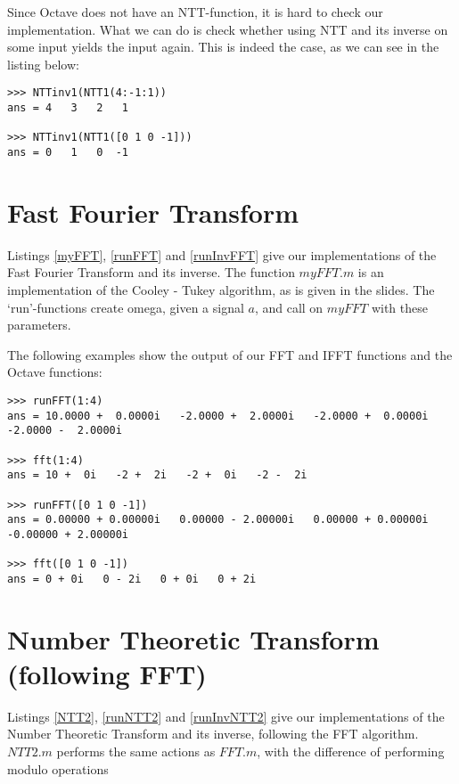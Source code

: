 \documentclass{article}
\begin{document}
Since Octave does not have an NTT-function, it is hard to check our implementation.
What we can do is check whether using NTT and its inverse on some input yields
the input again. This is indeed the case, as we can see in the listing below:

\begin{lstlisting}
>>> NTTinv1(NTT1(4:-1:1))
ans = 4   3   2   1

>>> NTTinv1(NTT1([0 1 0 -1]))
ans = 0   1   0  -1
\end{lstlisting}

 
 
 

\section{Fast Fourier Transform}
Listings \ref{myFFT}, \ref{runFFT} and \ref{runInvFFT} give our implementations of the Fast Fourier Transform and its inverse. The function $myFFT.m$ is an implementation of the Cooley - Tukey algorithm, as is given in the slides. The `run'-functions create omega, given a signal $a$, and call on $myFFT$ with these parameters.

The following examples show the output of our FFT and IFFT functions and the Octave functions:

\begin{lstlisting}
>>> runFFT(1:4)
ans = 10.0000 +  0.0000i   -2.0000 +  2.0000i   -2.0000 +  0.0000i   -2.0000 -  2.0000i

>>> fft(1:4)
ans = 10 +  0i   -2 +  2i   -2 +  0i   -2 -  2i

>>> runFFT([0 1 0 -1])
ans = 0.00000 + 0.00000i   0.00000 - 2.00000i   0.00000 + 0.00000i   -0.00000 + 2.00000i

>>> fft([0 1 0 -1])
ans = 0 + 0i   0 - 2i   0 + 0i   0 + 2i
\end{lstlisting}

 
 
 

\section{Number Theoretic Transform (following FFT)}
Listings \ref{NTT2}, \ref{runNTT2} and \ref{runInvNTT2} give our implementations of the Number Theoretic Transform and its inverse, following the FFT algorithm. $NTT2.m$ performs the same actions as $FFT.m$, with the difference of performing modulo operations
\end{document}
